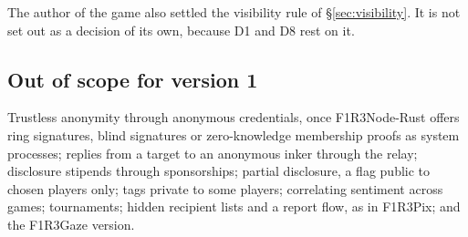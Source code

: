 \documentclass[11pt,a4paper]{article}
\begin{document}
The author of the game also settled the visibility rule of \S\ref{sec:visibility}. It is not
set out as a decision of its own, because D1 and D8 rest on it.

\subsection{Out of scope for version 1}\label{sec:future}

Trustless anonymity through anonymous credentials, once F1R3Node-Rust offers ring signatures,
blind signatures or zero-knowledge membership proofs as system processes; replies from a target
to an anonymous inker through the relay; disclosure stipends through sponsorships; partial
disclosure, a flag public to chosen players only; tags private to some players; correlating
sentiment across games; tournaments; hidden recipient lists and a report flow, as in F1R3Pix;
and the F1R3Gaze version.
\end{document}
